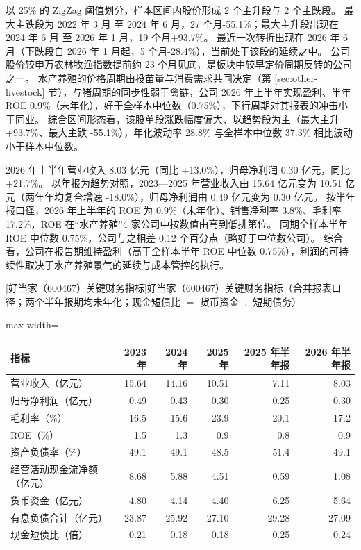  以 25\% 的 ZigZag 阈值划分，样本区间内股价形成 2 个主升段与 2 个主跌段。 最大主跌段为 2022 年 3 月 至 2024 年 6 月，27 个月-55.1\%；最大主升段出现在 2024 年 6 月 至 2026 年 1 月，19 个月+93.7\%。 最近一次转折出现在 2026 年 6 月（下跌段自 2026 年 1 月起，5 个月-28.4\%），当前处于该段的延续之中。 公司股价较申万农林牧渔指数提前约 23 个月见底，是板块中较早定价周期反转的公司之一。 水产养殖的价格周期由投苗量与消费需求共同决定（第 \ref{sec:other-livestock} 节），与猪周期的同步性弱于禽链，公司 2026 年上半年实现盈利、半年 ROE 0.9\%（未年化），好于全样本中位数（0.75\%），下行周期对其报表的冲击小于同业。 综合区间形态看，该股单段涨跌幅度偏大、以趋势段为主（最大主升 +93.7\%、最大主跌 -55.1\%），年化波动率 28.8\% 与全样本中位数 37.3\% 相比波动小于样本中位数。

 2026 年上半年营业收入 8.03 亿元（同比 +13.0\%），归母净利润 0.30 亿元，同比 +21.7\%。 以年报为趋势对照，2023---2025 年营业收入由 15.64 亿元变为 10.51 亿元（两年年均复合增速 -18.0\%），归母净利润由 0.49 亿元变为 0.30 亿元。 按半年报口径，2026 年上半年的 ROE 为 0.9\%（未年化）、销售净利率 3.8\%、毛利率 17.2\%，ROE 在“水产养殖”4 家公司中按数值由高到低排第位。 同期全样本半年 ROE 中位数 0.75\%，公司与之相差 0.12 个百分点（略好于中位数公司）。 综合看，公司在报告期维持盈利（高于全样本半年 ROE 中位数 0.75\%），利润的可持续性取决于水产养殖景气的延续与成本管控的执行。

\begin{center}\small\setlength{\tabcolsep}{3.4pt}
[好当家（600467）关键财务指标]{好当家（600467）关键财务指标（合并报表口径；两个半年报期均未年化；现金短债比 $=$ 货币资金 $\div$ 短期债务）}
\begin{adjustbox}{max width=\textwidth}
\begin{tabular}{@{}lrrrrr@{}}
\toprule
指标 & 2023 年 & 2024 年 & 2025 年 & 2025 年半年报 & 2026 年半年报 \\
\midrule
营业收入（亿元） & 15.64 & 14.16 & 10.51 & 7.11 & 8.03 \\
归母净利润（亿元） & 0.49 & 0.43 & 0.30 & 0.25 & 0.30 \\
毛利率（\%） & 16.5 & 15.6 & 23.9 & 20.1 & 17.2 \\
ROE（\%） & 1.5 & 1.3 & 0.9 & 0.8 & 0.9 \\
资产负债率（\%） & 49.1 & 49.1 & 48.5 & 51.4 & 49.1 \\
经营活动现金流净额（亿元） & 8.68 & 5.88 & 4.51 & 0.59 & 1.08 \\
货币资金（亿元） & 4.80 & 4.14 & 4.40 & 6.25 & 5.64 \\
有息负债合计（亿元） & 23.87 & 25.92 & 27.10 & 29.28 & 27.09 \\
现金短债比（倍） & 0.21 & 0.18 & 0.18 & 0.25 & 0.24 \\
\bottomrule
\end{tabular}
\end{adjustbox}
\end{center}

